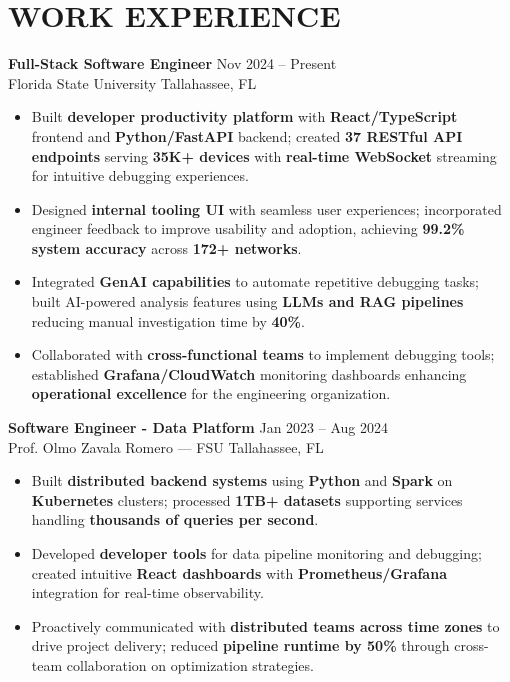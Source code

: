 \documentclass[letterpaper,10pt]{article}
\newcommand{\resumeItem}[1]{\item\small #1}
\newcommand{\resumeSubheading}[4]{
  \vspace{6pt}
  \noindent
  \textbf{#1} \hfill {\footnotesize #2} \\
  [-1pt]
  \noindent
  \small #3 \hfill {\small #4}
  \vspace{3pt}
}
\newcommand{\resumeItemsStart}{\vspace{-2pt}\begin{itemize}}
\newcommand{\resumeItemsEnd}{\end{itemize}\vspace{6pt}}
\begin{document}
\section{\textcolor{metablue}{WORK EXPERIENCE}}
\vspace{-12pt}

\resumeSubheading
{Full-Stack Software Engineer}{Nov 2024 -- Present}
{Florida State University}{Tallahassee, FL}
\resumeItemsStart
\resumeItem{Built \textbf{developer productivity platform} with \textbf{React/TypeScript} frontend and \textbf{Python/FastAPI} backend; created \textbf{37 RESTful API endpoints} serving \textbf{35K+ devices} with \textbf{real-time WebSocket} streaming for intuitive debugging experiences.}
\resumeItem{Designed \textbf{internal tooling UI} with seamless user experiences; incorporated engineer feedback to improve usability and adoption, achieving \textbf{99.2\% system accuracy} across \textbf{172+ networks}.}
\resumeItem{Integrated \textbf{GenAI capabilities} to automate repetitive debugging tasks; built AI-powered analysis features using \textbf{LLMs and RAG pipelines} reducing manual investigation time by \textbf{40\%}.}
\resumeItem{Collaborated with \textbf{cross-functional teams} to implement debugging tools; established \textbf{Grafana/CloudWatch} monitoring dashboards enhancing \textbf{operational excellence} for the engineering organization.}
\resumeItemsEnd
\vspace{-12pt}

\resumeSubheading
{Software Engineer - Data Platform}{Jan 2023 -- Aug 2024}
{Prof. Olmo Zavala Romero — FSU}{Tallahassee, FL}
\resumeItemsStart
\resumeItem{Built \textbf{distributed backend systems} using \textbf{Python} and \textbf{Spark} on \textbf{Kubernetes} clusters; processed \textbf{1TB+ datasets} supporting services handling \textbf{thousands of queries per second}.}
\resumeItem{Developed \textbf{developer tools} for data pipeline monitoring and debugging; created intuitive \textbf{React dashboards} with \textbf{Prometheus/Grafana} integration for real-time observability.}
\resumeItem{Proactively communicated with \textbf{distributed teams across time zones} to drive project delivery; reduced \textbf{pipeline runtime by 50\%} through cross-team collaboration on optimization strategies.}
\resumeItemsEnd
\vspace{-12pt}
\end{document}
